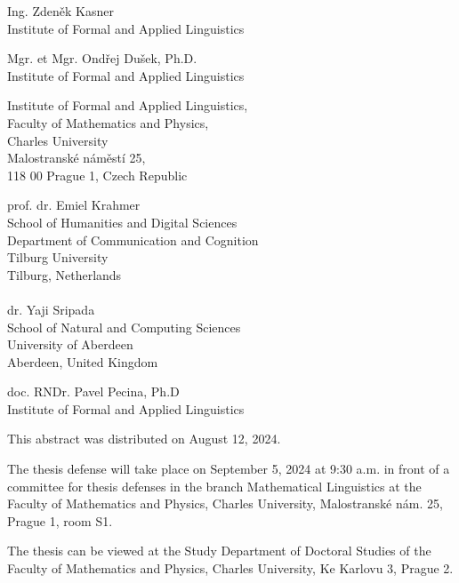 \documentclass[12pt,notitlepage,a4paper,oneside,openany]{report}
\begin{document}
\begin{description}[leftmargin=15.5em,labelwidth=15.5em,labelindent=0em,labelsep=0em]
    \item[Doctoral Candidate:] Ing. Zdeněk Kasner\\Institute of Formal and Applied Linguistics
    \item[Supervisor:] Mgr. et Mgr. Ondřej Dušek, Ph.D.\\Institute of Formal and Applied Linguistics
    \item[Department:]  Institute of Formal and Applied Linguistics,
        \\Faculty of Mathematics and Physics,
        \\Charles University
        \\Malostranské náměstí 25,
        \\118 00 Prague 1, Czech Republic

    \item[Opponents:] prof. dr. Emiel Krahmer\\School of Humanities and Digital Sciences\\Department of Communication and Cognition\\Tilburg University\\Tilburg, Netherlands\\ \\ dr. Yaji Sripada\\ School of Natural and Computing Sciences\\University of Aberdeen\\Aberdeen, United Kingdom

    \item[Chairman of Academic Council:] doc. RNDr. Pavel Pecina, Ph.D\\Institute of Formal and Applied Linguistics
\end{description}

\vfill
\noindent This abstract was distributed on August 12, 2024.

\vspace{0.5cm}

\noindent The thesis defense will take place on September 5, 2024 at 9:30 a.m. in front of a committee for thesis defenses in the branch Mathematical Linguistics at the Faculty of Mathematics and Physics, Charles University, Malostranské nám. 25, Prague 1, room S1.

\vspace{0.5cm}

\noindent The thesis can be viewed at the Study Department of Doctoral Studies of the Faculty of Mathematics and Physics, Charles University, Ke Karlovu 3, Prague 2.
\end{document}
